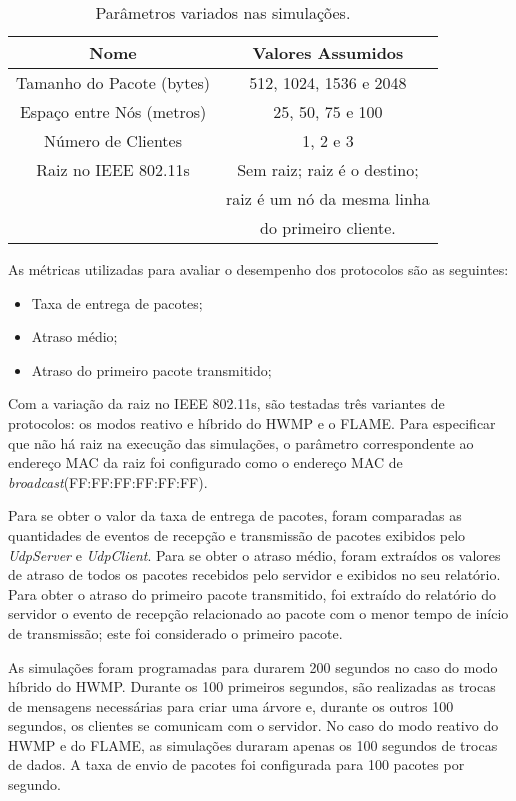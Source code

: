 \documentclass[letterpaper, 10 pt, conference]{ieeeconf}  %
\begin{document}
\begin{table}[!ht]
\caption{Parâmetros variados nas simulações.}
\centering
\small
\begin{tabular}{|c|c|}\hline
\textbf{Nome} & \textbf{Valores Assumidos} \\\hline
\hline
Tamanho do Pacote (bytes) & 512, 1024, 1536 e 2048\\\hline
 Espaço entre Nós (metros) & 25, 50, 75 e 100\\\hline
  Número de Clientes & 1, 2 e 3\\\hline
  Raiz no IEEE 802.11s & Sem raiz; raiz é o destino;\\
   & raiz é um nó da mesma linha\\
   & do primeiro cliente.\\\hline
\end{tabular}
\label{tab:params}
\end{table}

As métricas utilizadas para avaliar o desempenho dos protocolos são as seguintes:

\begin{itemize}
	\item Taxa de entrega de pacotes;
    \item Atraso médio;
    \item Atraso do primeiro pacote transmitido;
\end{itemize}

Com a variação da raiz no IEEE 802.11s, são testadas três variantes de protocolos: os modos reativo e híbrido do HWMP e o FLAME. Para especificar que não há raiz na execução das simulações, o parâmetro correspondente ao endereço MAC da raiz foi configurado como o endereço MAC de \textit{broadcast}(FF:FF:FF:FF:FF:FF).

Para se obter o valor da taxa de entrega de pacotes, foram comparadas as quantidades de eventos de recepção e transmissão de pacotes exibidos pelo \textit{UdpServer} e \textit{UdpClient}. Para se obter o atraso médio, foram extraídos os valores de atraso de todos os pacotes recebidos pelo servidor e exibidos no seu relatório. Para obter o atraso do primeiro pacote transmitido, foi extraído do relatório do servidor o evento de recepção relacionado ao pacote com o menor tempo de início de transmissão; este foi considerado o primeiro pacote.

As simulações foram programadas para durarem 200 segundos no caso do modo híbrido do HWMP. Durante os 100 primeiros segundos, são realizadas as trocas de mensagens necessárias para criar uma árvore e, durante os outros 100 segundos, os clientes se comunicam com o servidor. No caso do modo reativo do HWMP e do FLAME, as simulações duraram apenas os 100 segundos de trocas de dados. A taxa de envio de pacotes foi configurada para 100 pacotes por segundo.
\end{document}
